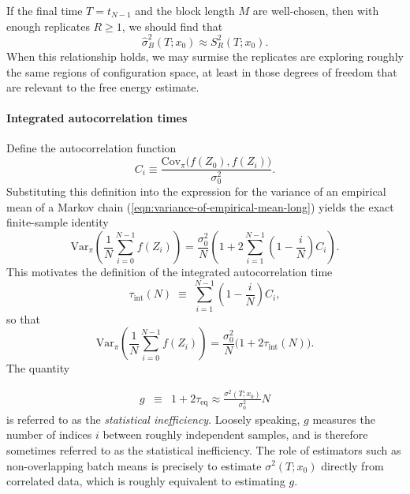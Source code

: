 \documentclass[9pt,bestpractices]{livecoms}
\begin{document}
If the final time $T=t_{N-1}$ and the block length $M$ are well-chosen, then with enough replicates $R\geqslant 1$, we should find that
$$ \hat\sigma_B^2(T; x_0) \approx S_R^2(T ; x_0) .$$
When this relationship holds, we may surmise the replicates are exploring roughly the same regions of configuration space, at least in those degrees of freedom that are relevant to the free energy estimate. 

\paragraph{Integrated autocorrelation times}

Define the autocorrelation function 
\begin{equation}
C_i \equiv
\frac{\mathrm{Cov}_{\pi}\!\bigl(f(Z_0), f(Z_i)\bigr)}{\sigma_0^2}.
\label{equation:autocorrelation-definition}
\end{equation}
Substituting this definition into the expression for the variance of an empirical mean of a Markov chain (\ref{eqn:variance-of-empirical-mean-long}) yields the exact finite-sample identity
\begin{equation}
\mathrm{Var}_{\pi}\!\left(\frac{1}{N}\sum_{i=0}^{N-1} f(Z_i) \right)
=
\frac{\sigma_0^2}{N}
\left(
1 + 2\sum_{i=1}^{N-1}\left(1-\frac{i}{N}\right) C_i
\right).
\end{equation}
This motivates the definition of the integrated autocorrelation time
\begin{equation}
\tau_{\mathrm{int}}(N)
\;\equiv\;
\sum_{i=1}^{N-1}\left(1-\frac{i}{N}\right) C_i,
\label{eq:integrated-autocorrelation-time-definition}
\end{equation}
so that
\[
\mathrm{Var}_{\pi}\!\left(\frac{1}{N}\sum_{i=0}^{N-1} f(Z_i) \right)
= \frac{\sigma_0^2}{N}\bigl(1+2\tau_{\mathrm{int}}(N)\bigr).
\]
The quantity 

\begin{eqnarray}
g &\equiv& 1 + 2 \tau_\mathrm{eq} \approx  \frac{\sigma^2(T;x_0)}{\sigma_0^2} N \label{eq:statistical-inefficiency-definition} 
\end{eqnarray}
is referred to as the \textit{statistical inefficiency}. Loosely speaking, $g$ measures the number of indices $i$ between roughly independent samples, and is therefore sometimes referred to as the statistical inefficiency. The role of estimators such as non-overlapping batch means is precisely to estimate $\sigma^2(T;x_0)$ directly from correlated data, which is roughly equivalent to estimating $g$. 
\end{document}
